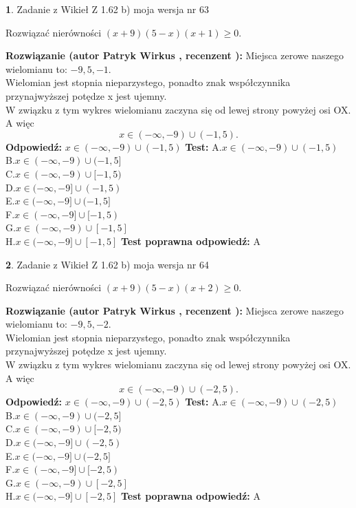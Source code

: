 \documentclass[12pt, a4paper]{article}
\theoremstyle{definition} %
\newtheorem{zad}{}
\newcommand{\zadStart}[1]{\begin{zad}#1\newline}
\newcommand{\zadStop}{\end{zad}}
\newcommand{\rozwStart}[2]{\noindent \textbf{Rozwiązanie (autor #1 , recenzent #2): }\newline}
\newcommand{\rozwStop}{\newline}
\newcommand{\odpStart}{\noindent \textbf{Odpowiedź:}\newline}
\newcommand{\odpStop}{\newline}
\newcommand{\testStart}{\noindent \textbf{Test:}\newline}
\newcommand{\testStop}{\newline}
\newcommand{\kluczStart}{\noindent \textbf{Test poprawna odpowiedź:}\newline}
\newcommand{\kluczStop}{\newline}
\begin{document}
\zadStart{Zadanie z Wikieł Z 1.62 b) moja wersja nr 63}

Rozwiązać nierówności $(x+9)(5-x)(x+1)\ge0$.
\zadStop
\rozwStart{Patryk Wirkus}{}
Miejsca zerowe naszego wielomianu to: $-9, 5, -1$.\\
Wielomian jest stopnia nieparzystego, ponadto znak współczynnika przy\linebreak najwyższej potędze x jest ujemny.\\ W związku z tym wykres wielomianu zaczyna się od lewej strony powyżej osi OX. A więc $$x \in (-\infty,-9) \cup (-1,5).$$
\rozwStop
\odpStart
$x \in (-\infty,-9) \cup (-1,5)$
\odpStop
\testStart
A.$x \in (-\infty,-9) \cup (-1,5)$\\
B.$x \in (-\infty,-9) \cup (-1,5]$\\
C.$x \in (-\infty,-9) \cup [-1,5)$\\
D.$x \in (-\infty,-9] \cup (-1,5)$\\
E.$x \in (-\infty,-9] \cup (-1,5]$\\
F.$x \in (-\infty,-9] \cup [-1,5)$\\
G.$x \in (-\infty,-9) \cup [-1,5]$\\
H.$x \in (-\infty,-9] \cup [-1,5]$
\testStop
\kluczStart
A
\kluczStop



\zadStart{Zadanie z Wikieł Z 1.62 b) moja wersja nr 64}

Rozwiązać nierówności $(x+9)(5-x)(x+2)\ge0$.
\zadStop
\rozwStart{Patryk Wirkus}{}
Miejsca zerowe naszego wielomianu to: $-9, 5, -2$.\\
Wielomian jest stopnia nieparzystego, ponadto znak współczynnika przy\linebreak najwyższej potędze x jest ujemny.\\ W związku z tym wykres wielomianu zaczyna się od lewej strony powyżej osi OX. A więc $$x \in (-\infty,-9) \cup (-2,5).$$
\rozwStop
\odpStart
$x \in (-\infty,-9) \cup (-2,5)$
\odpStop
\testStart
A.$x \in (-\infty,-9) \cup (-2,5)$\\
B.$x \in (-\infty,-9) \cup (-2,5]$\\
C.$x \in (-\infty,-9) \cup [-2,5)$\\
D.$x \in (-\infty,-9] \cup (-2,5)$\\
E.$x \in (-\infty,-9] \cup (-2,5]$\\
F.$x \in (-\infty,-9] \cup [-2,5)$\\
G.$x \in (-\infty,-9) \cup [-2,5]$\\
H.$x \in (-\infty,-9] \cup [-2,5]$
\testStop
\kluczStart
A
\kluczStop
\end{document}
